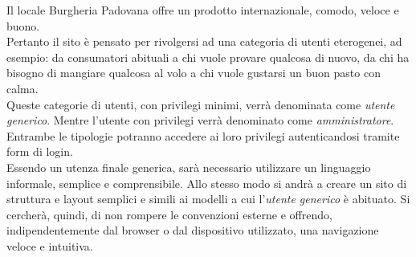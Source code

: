 Il locale Burgheria Padovana offre un prodotto internazionale, comodo, veloce e buono.\\
Pertanto il sito è pensato per rivolgersi ad una categoria di utenti eterogenei, ad esempio: da consumatori abituali a chi vuole provare qualcosa di nuovo, da chi ha bisogno di mangiare qualcosa al volo a chi vuole gustarsi un buon pasto con calma.\\
Queste categorie di utenti, con privilegi minimi, verrà denominata come \emph{utente generico}.
Mentre l'utente con privilegi verrà denominato come \emph{amministratore}.\\ 
Entrambe le tipologie potranno accedere ai loro privilegi autenticandosi tramite form di login.\\
Essendo un utenza finale generica, sarà necessario utilizzare un linguaggio informale, semplice e comprensibile.
Allo stesso modo si andrà a creare un sito di struttura e layout semplici e simili ai modelli a cui l'\emph{utente generico} è abituato.
Si cercherà, quindi, di non rompere le convenzioni esterne e offrendo, indipendentemente dal browser o dal dispositivo utilizzato, una navigazione veloce e intuitiva.\\